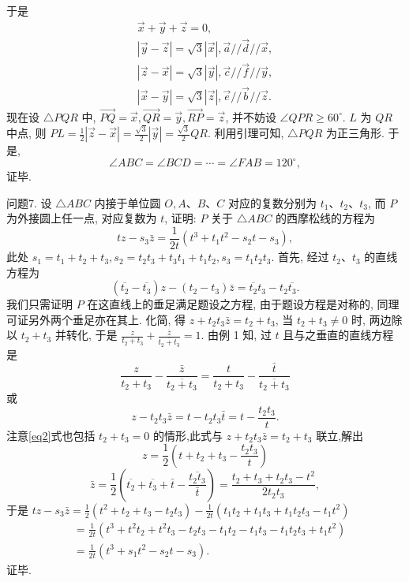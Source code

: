 于是
$$
\begin{gathered}
\vec{x}+\vec{y}+\vec{z}=0, \\
|\vec{y}-\vec{z}|=\sqrt{3}|\vec{x}|, \vec{a} / / \vec{d} / / \vec{x}, \\
|\vec{z}-\vec{x}|=\sqrt{3}|\vec{y}|, \vec{c} / / \vec{f} / / \vec{y}, \\
|\vec{x}-\vec{y}|=\sqrt{3}|\vec{z}|, \vec{e} / / \vec{b} / / \vec{z} .
\end{gathered}
$$
现在设 $\triangle P Q R$ 中, $\overrightarrow{P Q}=\vec{x}, \overrightarrow{Q R}=\vec{y}, \overrightarrow{R P}=\vec{z}$, 并不妨设 $\angle Q P R \geqslant 60^{\circ}$. $L$ 为 $Q R$ 中点, 则 $P L=\frac{1}{2}|\vec{z}-\vec{x}|=\frac{\sqrt{3}}{2}|\vec{y}|=\frac{\sqrt{3}}{2} Q R$. 利用引理可知, $\triangle P Q R$ 为正三角形.
于是,
$$
\angle A B C=\angle B C D=\cdots=\angle F A B=120^{\circ},
$$
证毕.



问题7. 设 $\triangle A B C$ 内接于单位圆 $O, A 、 B 、 C$ 对应的复数分别为 $t_1 、 t_2 、 t_3$, 而 $P$ 为外接圆上任一点, 对应复数为 $t$, 证明: $P$ 关于 $\triangle A B C$ 的西摩松线的方程为
$$
t z-s_3 \bar{z}=\frac{1}{2 t}\left(t^3+t_1 t^2-s_2 t-s_3\right), \label{eq1}
$$
此处 $s_1=t_1+t_2+t_3, s_2=t_2 t_3+t_3 t_1+t_1 t_2, s_3=t_1 t_2 t_3$.
首先, 经过 $t_2 、 t_3$ 的直线方程为
$$
\left(\overline{t_2}-\overline{t_3}\right) z-\left(t_2-t_3\right) \bar{z}=\overline{t_2} t_3-t_2 \overline{t_3} .
$$
我们只需证明 $P$ 在这直线上的垂足满足题设之方程, 由于题设方程是对称的, 同理可证另外两个垂足亦在其上.
化简, 得 $z+t_2 t_3 \bar{z}=t_2+t_3$, 当 $t_2+t_3 \neq 0$ 时, 两边除以 $t_2+t_3$ 并转化, 于是 $\frac{z}{t_2+t_3}+\frac{\bar{z}}{\overline{t_2+t_3}}=1$. 由例 1 知, 过 $t$ 且与之垂直的直线方程是
$$
\frac{z}{t_2+t_3}-\frac{\bar{z}}{\overline{t_2+t_3}}=\frac{t}{t_2+t_3}-\frac{\bar{t}}{\overline{t_2+t_3}}
$$
或
$$
z-t_2 t_3 \bar{z}=t-t_2 t_3 \bar{t}=t-\frac{t_2 t_3}{t} . \label{eq2}
$$
注意\ref{eq2}式也包括 $t_2+t_3=0$ 的情形,此式与 $z+t_2 t_3 \bar{z}=t_2+t_3$ 联立,解出
$$
z=\frac{1}{2}\left(t+t_2+t_3-\frac{t_2 t_3}{t}\right)
$$
$$
\bar{z}=\frac{1}{2}\left(\overline{t_2}+\overline{t_3}+\bar{t}-\frac{\overline{t_2 t_3}}{\bar{t}}\right)=\frac{t_2+t_3+t_2 t_3-t^2}{2 t_2 t_3},
$$
于是 $t z-s_3 \bar{z}=\frac{1}{2}\left(t^2+t_2+t_3-t_2 t_3\right)-\frac{1}{2 t}\left(t_1 t_2+t_1 t_3+t_1 t_2 t_3-t_1 t^2\right)$
$$
\begin{aligned}
& =\frac{1}{2 t}\left(t^3+t^2 t_2+t^2 t_3-t_2 t_3-t_1 t_2-t_1 t_3-t_1 t_2 t_3+t_1 t^2\right) \\
& =\frac{1}{2 t}\left(t^3+s_1 t^2-s_2 t-s_3\right) .
\end{aligned}
$$
证毕.



